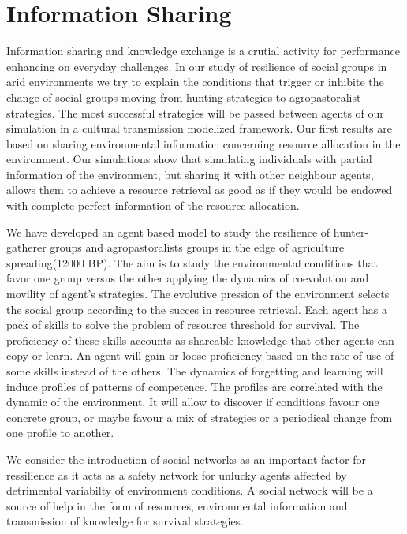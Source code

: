\documentclass[11pt,oneside,a4paper,openright]{report}
\begin{document}
\section{Information Sharing}

Information sharing and knowledge exchange is a crutial activity for
performance enhancing on everyday challenges. In our study of resilience of
social groups in arid environments we try to explain the conditions that
trigger or inhibite the change of social groups moving from hunting strategies
to agropastoralist strategies. The most successful strategies will be passed between agents of our simulation in a cultural transmission modelized framework. Our first
results are based on sharing environmental information concerning resource
allocation in the environment. Our simulations show that simulating individuals
with partial information of the environment, but sharing it with other
neighbour agents, allows them to achieve a resource retrieval as good as if
they would be endowed with complete perfect information of the resource allocation.

We have developed an agent based model to study the resilience of hunter-gatherer
groups and agropastoralists groups in the edge of agriculture spreading(12000 BP). The aim is to study the environmental conditions that favor one group versus the other
applying the dynamics of coevolution and movility of agent's strategies. The
evolutive pression of the environment selects the social group according
to the succes in resource retrieval. Each agent has a pack of skills to solve the problem of resource threshold for survival. The proficiency of these skills accounts as shareable knowledge that other agents can copy or learn. An agent will gain or loose proficiency based on the rate of use of some skills instead of the others. The dynamics of
forgetting and learning will induce profiles of patterns of competence. The profiles
are correlated with the dynamic of the environment. It will allow to discover if
conditions favour one concrete group, or maybe favour a mix of strategies or a periodical change from one profile to another.

We consider the introduction of social networks as an important factor for ressilience as it acts as a safety network for unlucky agents affected by detrimental variabilty
of environment conditions. A social network will be a source of help in the form
of resources, environmental information and transmission of knowledge for survival strategies.
\end{document}
